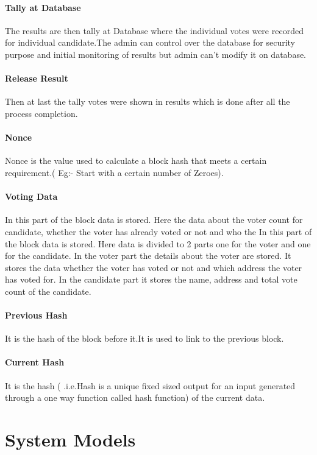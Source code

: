 \documentclass[a4paper,12pt]{report}
\begin{document}
\paragraph{Tally at Database}
The results are then tally at Database where the individual votes were recorded for individual candidate.The admin can control over the database for security purpose and initial monitoring of results but admin can't modify it on database.

\paragraph{Release Result}
Then at last the tally votes were shown in results which is done after all the process completion.

\paragraph{Nonce}
Nonce is the value used to calculate a block hash that meets a certain requirement.( Eg:- Start with a certain number of Zeroes).

\paragraph{Voting Data}
In this part of the block data is stored. Here the data about the voter count for candidate, whether the voter has already voted or not  and who the 
In this part of the block data is stored. Here data is divided to 2 parts one for the voter and one for the candidate. In the voter part the details about the voter are stored. It stores the data whether the voter has voted or not and which address the voter has voted for. In the candidate part it stores the name, address and total vote count of the candidate.

\paragraph{Previous Hash}
It is the hash of the block before it.It is used to link to the previous block.

\paragraph{Current Hash}
It is the hash ( .i.e.Hash is a unique fixed sized output for an input generated through a one way function called hash function) of the current data.

\section{System Models}
\end{document}
